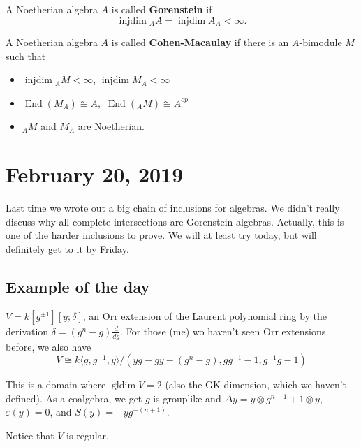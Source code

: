 \documentclass[12pt]{article}
\theoremstyle{break}
\theoremstyle{nonumberbreak}
\theoremstyle{changebreak}
\theoremstyle{break}
\theoremstyle{nonumberbreak}
\theoremstyle{nonumberplain}
\theoremstyle{change}
\DeclareMathOperator{\gldim}{gldim}
\DeclareMathOperator{\injdim}{injdim}
\DeclareMathOperator{\End}{End}
\begin{document}
\begin{defn}
	A Noetherian algebra $A$ is called \textbf{Gorenstein} if 
	\[\injdim{_AA}=\injdim A_A<\infty.\]
\end{defn}
\begin{defn}
	A Noetherian algebra $A$ is called \textbf{Cohen-Macaulay} if there is an $A$-bimodule
	$M$ such that
	\begin{itemize}
		\item $\injdim {_AM}<\infty$, $\injdim M_A<\infty$
		\item $\End(M_A)\cong A,$ $\End({_AM})\cong A^{op}$
		\item ${_AM}$ and $M_A$ are Noetherian.
	\end{itemize}
\end{defn}

\section{February 20, 2019}
Last time we wrote out a big chain of inclusions for algebras. We didn't really discuss why all complete
intersections are Gorenstein algebras. Actually, this is one of the harder inclusions to prove. We will at least 
try today, but will definitely get to it by Friday.

\subsection{Example of the day}
\begin{defn}
	$V=k[g^{\pm 1}][y;\delta]$, an Orr extension of the Laurent polynomial ring by the derivation $\delta=(g^n-g)\frac{d}{dg}$.
	For those (me) wo haven't seen Orr extensions before, we also have
	\[V\cong k\langle g, g^{-1}, y\rangle/(yg-gy-(g^n-g), gg^{-1}-1, g^{-1}g-1)\]

	This is a domain where $\gldim V=2$ (also the GK dimension, which we haven't defined). As a coalgebra, we get
	$g$ is grouplike and $\Delta y= y\otimes g^{n-1}+1\otimes y$, $\varepsilon(y)=0$, and $S(y)=-yg^{-(n+1)}$.

	Notice that $V$ is regular.
\end{defn}
\end{document}
